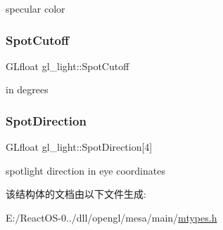 specular color \mbox{\label{structgl__light_a91b46665de8092bdade1c65ab503b98b}} 
\subsubsection{\texorpdfstring{Spot\+Cutoff}{SpotCutoff}}
{\footnotesize\ttfamily G\+Lfloat gl\+\_\+light\+::\+Spot\+Cutoff}

in degrees \mbox{\label{structgl__light_a4a0cc95610335fee130b19430ff00635}} 
\subsubsection{\texorpdfstring{Spot\+Direction}{SpotDirection}}
{\footnotesize\ttfamily G\+Lfloat gl\+\_\+light\+::\+Spot\+Direction\mbox{[}4\mbox{]}}

spotlight direction in eye coordinates 

该结构体的文档由以下文件生成\+:\begin{DoxyCompactItemize}
\item 
E\+:/\+React\+O\+S-\/0../dll/opengl/mesa/main/\hyperlink{mtypes_8h}{mtypes.\+h}\end{DoxyCompactItemize}
